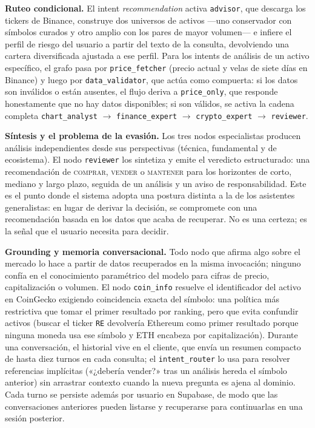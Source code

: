 \documentclass[runningheads]{llncs}
\begin{document}
\noindent\textbf{Ruteo condicional.} El intent \emph{recommendation} activa
\texttt{advisor}, que descarga los tickers de Binance, construye dos universos de activos
—uno conservador con símbolos curados y otro amplio con los pares de mayor volumen— e
infiere el perfil de riesgo del usuario a partir del texto de la consulta, devolviendo una
cartera diversificada ajustada a ese perfil. Para los intents de análisis de un activo
específico, el grafo pasa por \texttt{price\_fetcher} (precio actual y velas de siete días
en Binance) y luego por \texttt{data\_validator}, que actúa como compuerta: si los datos
son inválidos o están ausentes, el flujo deriva a \texttt{price\_only}, que responde
honestamente que no hay datos disponibles; si son válidos, se activa la cadena completa
\texttt{chart\_analyst} $\rightarrow$ \texttt{finance\_expert} $\rightarrow$
\texttt{crypto\_expert} $\rightarrow$ \texttt{reviewer}.

\noindent\textbf{Síntesis y el problema de la evasión.} Los tres nodos especialistas
producen análisis independientes desde sus perspectivas (técnica, fundamental y de
ecosistema). El nodo \texttt{reviewer} los sintetiza y emite el veredicto estructurado:
una recomendación de \textsc{comprar}, \textsc{vender} o \textsc{mantener} para los
horizontes de corto, mediano y largo plazo, seguida de un análisis y un aviso de
responsabilidad. Este es el punto donde el sistema adopta una postura distinta a la de los
asistentes generalistas: en lugar de derivar la decisión, se compromete con una
recomendación basada en los datos que acaba de recuperar. No es una certeza; es la señal
que el usuario necesita para decidir.

\noindent\textbf{Grounding y memoria conversacional.} Todo nodo que afirma algo sobre el
mercado lo hace a partir de datos recuperados en la misma invocación; ninguno confía en el
conocimiento paramétrico del modelo para cifras de precio, capitalización o volumen. El
nodo \texttt{coin\_info} resuelve el identificador del activo en CoinGecko exigiendo
coincidencia exacta del símbolo: una política más restrictiva que tomar el primer resultado
por ranking, pero que evita confundir activos (buscar el ticker \texttt{RE} devolvería
Ethereum como primer resultado porque ninguna moneda usa ese símbolo y ETH encabeza por
capitalización). Durante una conversación, el historial vive en el cliente, que envía un
resumen compacto de hasta diez turnos en cada consulta; el \texttt{intent\_router} lo usa
para resolver referencias implícitas («¿debería vender?» tras un análisis hereda el símbolo
anterior) sin arrastrar contexto cuando la nueva pregunta es ajena al dominio. Cada turno se
persiste además por usuario en Supabase, de modo que las conversaciones anteriores pueden
listarse y recuperarse para continuarlas en una sesión posterior.
\end{document}
